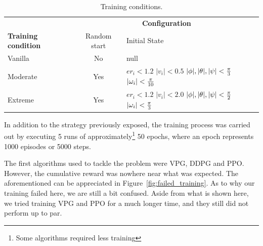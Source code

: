 \begin{table}[H]
    \centering
    \caption{Training conditions.}
    \label{tab:train_conditions}
    \begin{tabular}{l|c p{25mm}}
        \toprule[0.5pt]
                                    & \multicolumn{2}{c}{\textbf{Configuration}}    \\
        \textbf{Training condition} & Random start & Initial State \\
        \midrule[1pt]
        Vanilla                     & No    &  null       \\
        \toprule[0.5pt]
        Moderate                    & Yes   &  $er_i < 1.2$ \newline 
                                               $|v_i| < 0.5$ \newline
                                               $|\phi|,|\theta|,|\psi|<\textstyle \frac{\pi}{3}$ \newline
                                               $|\omega_i| < \textstyle \frac{\pi}{10}$ \\
        \toprule[0.5pt]
        Extreme                     & Yes   &  $er_i < 1.2$ \newline 
                                               $|v_i| < 2.0$ \newline
                                               $|\phi|,|\theta|,|\psi|<\textstyle \frac{\pi}{2}$ \newline
                                               $|\omega_i| < \textstyle \frac{\pi}{3}$ \\
        \bottomrule[2pt]
    \end{tabular}
\end{table}

In addition to the strategy previously exposed, the training process was carried out by 
executing 5 runs of approximately\footnote{Some algorithms required less training} 50 epochs,
where an epoch represents 1000 episodes or 5000 steps.

The first algorithms used to tackle the problem were VPG, DDPG and PPO. However, the cumulative 
reward was nowhere near what was expected. The aforementioned can be appreciated in 
Figure~\ref{fig:failed_training}. As to why our training failed here, we are still a bit confused. Aside from what is shown here, we tried training VPG and PPO for a much longer time, and they still did not perform up to par.

